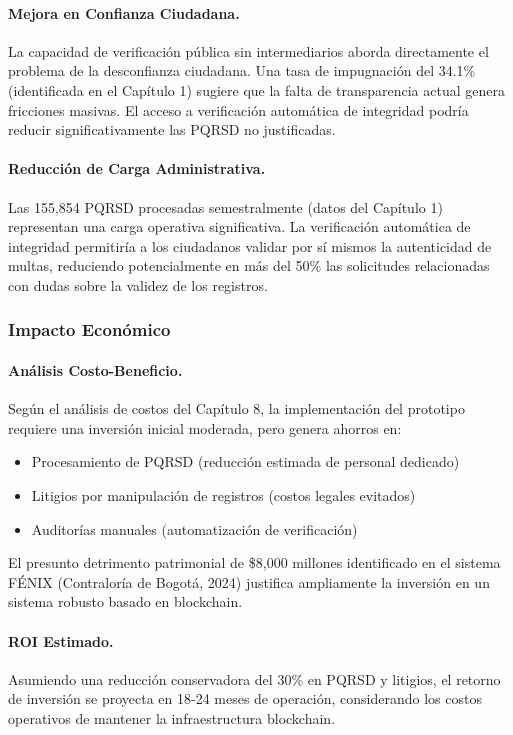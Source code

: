 \paragraph{Mejora en Confianza Ciudadana.}
La capacidad de verificación pública sin intermediarios aborda directamente el problema de la desconfianza ciudadana. Una tasa de impugnación del 34.1\% (identificada en el Capítulo 1) sugiere que la falta de transparencia actual genera fricciones masivas. El acceso a verificación automática de integridad podría reducir significativamente las PQRSD no justificadas.

\paragraph{Reducción de Carga Administrativa.}
Las 155,854 PQRSD procesadas semestralmente (datos del Capítulo 1) representan una carga operativa significativa. La verificación automática de integridad permitiría a los ciudadanos validar por sí mismos la autenticidad de multas, reduciendo potencialmente en más del 50\% las solicitudes relacionadas con dudas sobre la validez de los registros.

\subsubsection{Impacto Económico}

\paragraph{Análisis Costo-Beneficio.}
Según el análisis de costos del Capítulo 8, la implementación del prototipo requiere una inversión inicial moderada, pero genera ahorros en:
\begin{itemize}
    \item Procesamiento de PQRSD (reducción estimada de personal dedicado)
    \item Litigios por manipulación de registros (costos legales evitados)
    \item Auditorías manuales (automatización de verificación)
\end{itemize}

El presunto detrimento patrimonial de \$8,000 millones identificado en el sistema FÉNIX (Contraloría de Bogotá, 2024) justifica ampliamente la inversión en un sistema robusto basado en blockchain.

\paragraph{ROI Estimado.}
Asumiendo una reducción conservadora del 30\% en PQRSD y litigios, el retorno de inversión se proyecta en 18-24 meses de operación, considerando los costos operativos de mantener la infraestructura blockchain.

